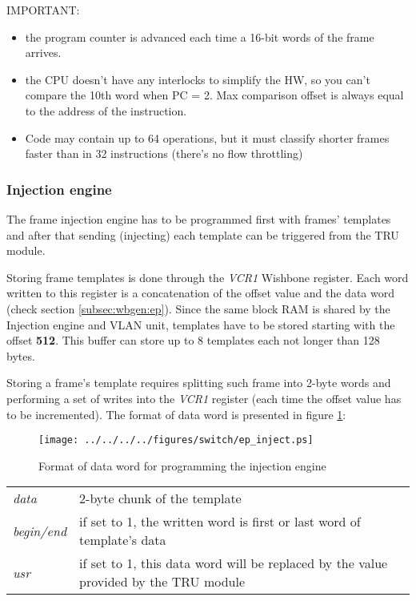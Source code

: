 IMPORTANT:
\begin{itemize}
  \item the program counter is advanced each time a 16-bit words of the frame arrives.
  \item the CPU doesn't have any interlocks to simplify the HW, so you can't
    compare the 10th word when PC = 2. Max comparison offset is always equal to
    the address of the instruction.
  \item Code may contain up to 64 operations, but it must classify shorter frames faster than in
  32 instructions (there's no flow throttling)
\end{itemize}

\subsubsection{Injection engine}
The frame injection engine has to be programmed first with frames' templates
and after that sending (injecting) each template can be triggered from the TRU
module.

Storing frame templates is done through the \emph{VCR1} Wishbone register. Each
word written to this register is a concatenation of the offset value and the data
word (check section \ref{subsec:wbgen:ep}). Since the same block RAM is shared
by the Injection engine and VLAN unit, templates have to be stored starting with
the offset {\bf 512}. This buffer can store up to 8 templates each not longer
than 128 bytes.

Storing a frame's template requires splitting such frame into 2-byte words and
performing a set of writes into the \emph{VCR1} register (each time the offset
value has to be incremented). The format of data word is presented in figure
\ref{fig:ep:inject_data}:
\begin{figure}[ht]
  \begin{center}
    \texttt{[image: ../../../../figures/switch/ep\_inject.ps]}
    \caption{Format of data word for programming the injection engine}
    \label{fig:ep:inject_data}
  \end{center}
\end{figure}

\begin{tabular}{l p{13cm}}
  \emph{data} & 2-byte chunk of the template\\
  \emph{begin/end} & if set to 1, the written word is first or last word of
    template's data\\
  \emph{usr} & if set to 1, this data word will be replaced by the value
    provided by the TRU module\\
\end{tabular}
